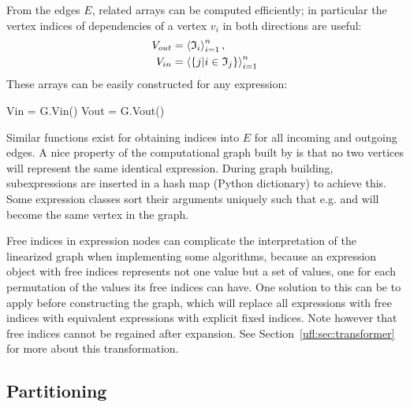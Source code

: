 %
%

From the edges $E$, related arrays can be computed efficiently; in
particular the vertex indices of dependencies of a vertex $v_i$ in
both directions are useful:
\begin{align}
\begin{split}
V_{out} &= \left\langle{\mathfrak{I}_i}\right\rangle_{i=1}^{n}, \\
V_{in}  &= \left\langle{\{ j | i \in \mathfrak{I}_j \}}\right\rangle_{i=1}^{n}
\end{split}
\end{align}
These arrays can be easily constructed for any expression:
\begin{python}
Vin = G.Vin()
Vout = G.Vout()
\end{python}
Similar functions exist for obtaining indices into $E$ for all
incoming and outgoing edges.  A nice property of the computational
graph built by \ufl{} is that no two vertices will represent the same
identical expression.  During graph building, subexpressions are
inserted in a hash map (Python dictionary) to achieve this. Some expression
classes sort their arguments uniquely such that e.g.  and
 will become the same vertex in the graph.

Free indices in expression nodes can complicate the interpretation of
the linearized graph when implementing some algorithms, because an
expression object with free indices represents not one value but a set
of values, one for each permutation of the values its free indices can
have.  One solution to this can be to apply 
before constructing the graph, which will replace all expressions with
free indices with equivalent expressions with explicit fixed indices.
Note however that free indices cannot be regained after expansion.
See Section~\ref{ufl:sec:transformer} for more about this transformation.

\subsection{Partitioning}

